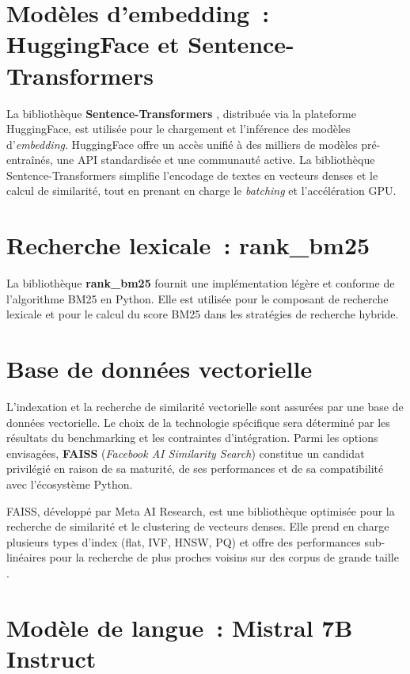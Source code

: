 \documentclass[12pt,a4paper,oneside]{report}
\begin{document}
\section{Modèles d'embedding~: HuggingFace et Sentence-Transformers}

La bibliothèque \textbf{Sentence-Transformers} \citep{reimers2019}, distribuée via la plateforme HuggingFace, est utilisée pour le chargement et l'inférence des modèles d'\textit{embedding}. HuggingFace offre un accès unifié à des milliers de modèles pré-entraînés, une API standardisée et une communauté active. La bibliothèque Sentence-Transformers simplifie l'encodage de textes en vecteurs denses et le calcul de similarité, tout en prenant en charge le \textit{batching} et l'accélération GPU.

\section{Recherche lexicale~: rank\_bm25}

La bibliothèque \textbf{rank\_bm25} fournit une implémentation légère et conforme de l'algorithme BM25 \citep{robertson2009} en Python. Elle est utilisée pour le composant de recherche lexicale et pour le calcul du score BM25 dans les stratégies de recherche hybride.

\section{Base de données vectorielle}

L'indexation et la recherche de similarité vectorielle sont assurées par une base de données vectorielle. Le choix de la technologie spécifique sera déterminé par les résultats du benchmarking et les contraintes d'intégration. Parmi les options envisagées, \textbf{FAISS} (\textit{Facebook AI Similarity Search}) \citep{johnson2019faiss} constitue un candidat privilégié en raison de sa maturité, de ses performances et de sa compatibilité avec l'écosystème Python.

FAISS, développé par Meta AI Research, est une bibliothèque optimisée pour la recherche de similarité et le clustering de vecteurs denses. Elle prend en charge plusieurs types d'index (flat, IVF, HNSW, PQ) et offre des performances sub-linéaires pour la recherche de plus proches voisins sur des corpus de grande taille \citep{johnson2019faiss}.

\section{Modèle de langue~: Mistral 7B Instruct}
\end{document}

